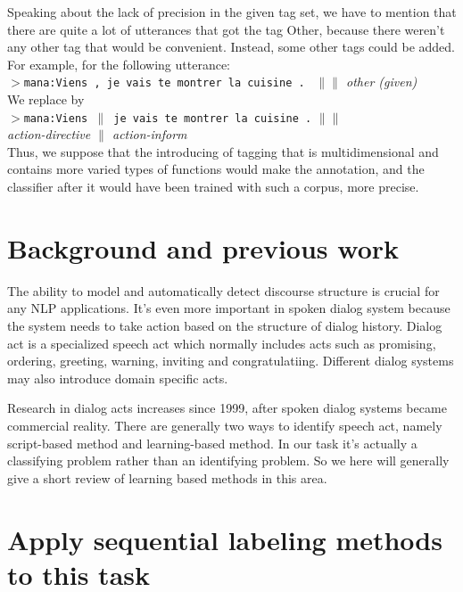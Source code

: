 \documentclass[a4paper]{article}
\begin{document}
Speaking about the lack of precision in the given tag set, we have to mention that there are quite a lot of utterances that got the tag Other, because there weren’t any other tag that would be convenient. Instead, some other tags could be added. For example, for the following utterance:\\
$>$\texttt{mana:Viens , je vais te montrer la cuisine . } \emph{\small $\|\|$ other (given)}\\
We replace by\\
$>$\texttt{mana:Viens $\|$ je vais te montrer la cuisine .} $\|\|$ \\
\emph{\small action-directive $\|$ action-inform}\\

Thus, we suppose that the introducing of tagging that is multidimensional and contains more varied types of functions would make the annotation, and the classifier after it would have been trained with such a corpus, more precise.\\


\section{Background and previous work}
The ability to model and automatically detect discourse structure is crucial for any NLP applications. It's even more important in spoken dialog system because the system needs to take action based on the structure of dialog history.
Dialog act is a specialized speech act which normally includes acts such as promising, ordering, greeting, warning, inviting and congratulatiing. Different dialog systems may also introduce domain specific acts. 

Research in dialog acts increases since 1999, after spoken dialog  systems became commercial reality. There are generally two ways to identify speech act, namely script-based method and learning-based method. In our task it's actually a classifying problem rather than an identifying problem. So we here will generally give a short review of learning based methods in this area.

\section{Apply sequential labeling methods to this task}
\end{document}
